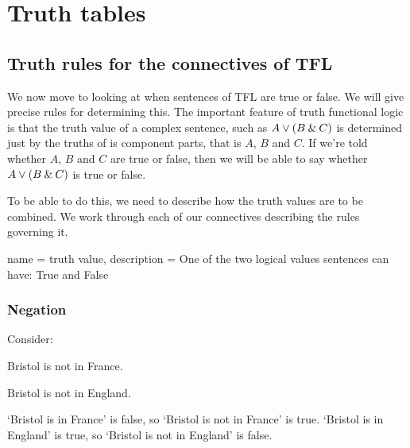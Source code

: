 \part{Truth tables}
\label{ch.TruthTables}

\chapter{Truth rules for the connectives of TFL}
\label{s:CharacteristicTruthTables}

We now move to looking at when sentences of TFL are true or false. We will give precise rules for determining this. The important feature of truth functional logic is that the truth value of a complex sentence, such as $A\vee(B\mathbin{\&} C)$ is determined just by the truths of is component parts, that is $A$, $B$ and $C$. If we're told whether $A$, $B$ and $C$ are true or false, then we will be able to say whether $A\vee(B\mathbin{\&} C)$ is true or false.

To be able to do this, we need to describe how the truth values are to be combined. We work through each of our connectives describing the rules governing it.

                 {
                   name = truth value,
                   description = {One of the two logical values sentences can have: True and False}
                   }


\section{Negation}

Consider:
\begin{earg}
\item[\ex{neg-f}] Bristol is not in France.
\item[\ex{neg-f}] Bristol is not in England.
\end{earg}
`Bristol is in France' is false, so `Bristol is not in France' is true.
`Bristol is in England' is true, so `Bristol is not in England' is false.

